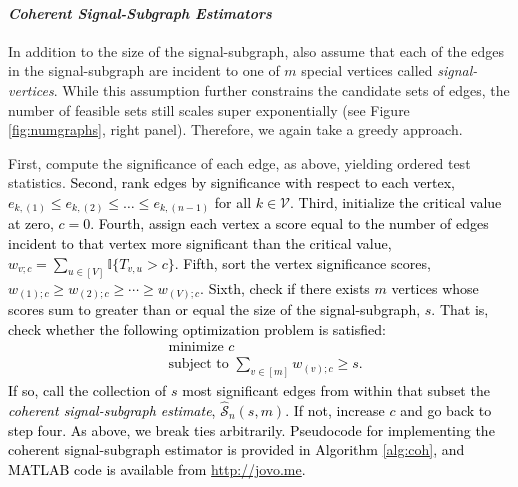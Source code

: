 \documentclass[10pt,journal,cspaper,compsoc]{IEEEtran}
\providecommand{\tk}[1]{\textcolor{black}{#1}}
\newcommand{\II}{\mathbb{I}}           %
\providecommand{\mc}[1]{\mathcal{#1}}
\providecommand{\mhc}[1]{\widehat{\mathcal{#1}}}
\begin{document}
\paragraph{\emph{Coherent Signal-Subgraph Estimators}}

In addition to the size of the signal-subgraph, also assume that each of the edges in the signal-subgraph are incident to one of $m$ special vertices called \emph{signal-vertices}. While this assumption further constrains the candidate sets of edges, the number of feasible sets still scales super exponentially (see Figure \ref{fig:numgraphs}, right panel).  Therefore, we again take a greedy approach.  

First, compute the significance of each edge, as above, yielding ordered test statistics. \tk{Second, rank edges by significance with respect to each vertex,  $e_{k,(1)} \leq e_{k,(2)} \leq \ldots \leq e_{k,(n-1)}$ for all $k \in \mc{V}$.  Third, initialize the critical value at zero, $c=0$. Fourth, assign each vertex a score equal to the number of edges incident to that vertex more significant than the critical value, $w_{v;c}=\sum_{u \in [V]} \II\{T_{v,u} > c\}$.  
Fifth, sort the vertex significance scores, $w_{(1);c} \geq w_{(2); c} \geq \cdots \geq w_{(V);c}$.
Sixth, check if there exists $m$ vertices whose scores sum to greater than or equal the size of the signal-subgraph, $s$.  That is, check whether the following optimization problem is satisfied:
\begin{align} \label{eq:coh}
	&\text{minimize } c \nonumber \\
	&\text{subject to } \sum_{v \in [m]} w_{(v);c}\geq s.
\end{align}
If so, call the collection of $s$ most significant edges from within that subset the \emph{coherent signal-subgraph estimate}, $\mhc{S}_n(s,m)$. %
If not, increase $c$ and go back to step four. 
As above, we break ties arbitrarily.
Pseudocode for implementing the coherent signal-subgraph estimator is provided in Algorithm \ref{alg:coh}, and MATLAB code is available from \url{http://jovo.me}.}
\end{document}

